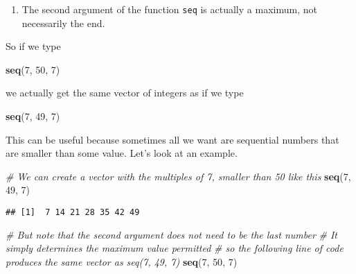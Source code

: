 \documentclass[
]{article}
\newenvironment{Shaded}{\begin{snugshade}}{\end{snugshade}}
\newcommand{\CommentTok}[1]{\textcolor[rgb]{0.56,0.35,0.01}{\textit{#1}}}
\newcommand{\DecValTok}[1]{\textcolor[rgb]{0.00,0.00,0.81}{#1}}
\newcommand{\KeywordTok}[1]{\textcolor[rgb]{0.13,0.29,0.53}{\textbf{#1}}}
\newcommand{\NormalTok}[1]{#1}
\providecommand{\tightlist}{%
  \setlength{\itemsep}{0pt}\setlength{\parskip}{0pt}}
\begin{document}
\begin{enumerate}
\def\labelenumi{\arabic{enumi}.}
\setcounter{enumi}{7}
\tightlist
\item
  The second argument of the function \texttt{seq} is actually a
  maximum, not necessarily the end.
\end{enumerate}

So if we type

\begin{Shaded}
\begin{Highlighting}[]
\KeywordTok{seq}\NormalTok{(}\DecValTok{7}\NormalTok{, }\DecValTok{50}\NormalTok{, }\DecValTok{7}\NormalTok{)}
\end{Highlighting}
\end{Shaded}

we actually get the same vector of integers as if we type

\begin{Shaded}
\begin{Highlighting}[]
\KeywordTok{seq}\NormalTok{(}\DecValTok{7}\NormalTok{, }\DecValTok{49}\NormalTok{, }\DecValTok{7}\NormalTok{)}
\end{Highlighting}
\end{Shaded}

This can be useful because sometimes all we want are sequential numbers
that are smaller than some value. Let's look at an example.

\begin{Shaded}
\begin{Highlighting}[]
\CommentTok{# We can create a vector with the multiples of 7, smaller than 50 like this }
\KeywordTok{seq}\NormalTok{(}\DecValTok{7}\NormalTok{, }\DecValTok{49}\NormalTok{, }\DecValTok{7}\NormalTok{) }
\end{Highlighting}
\end{Shaded}

\begin{verbatim}
## [1]  7 14 21 28 35 42 49
\end{verbatim}

\begin{Shaded}
\begin{Highlighting}[]
\CommentTok{# But note that the second argument does not need to be the last number}
\CommentTok{# It simply determines the maximum value permitted}
\CommentTok{# so the following line of code produces the same vector as seq(7, 49, 7)}
\KeywordTok{seq}\NormalTok{(}\DecValTok{7}\NormalTok{, }\DecValTok{50}\NormalTok{, }\DecValTok{7}\NormalTok{)}
\end{Highlighting}
\end{Shaded}
\end{document}
